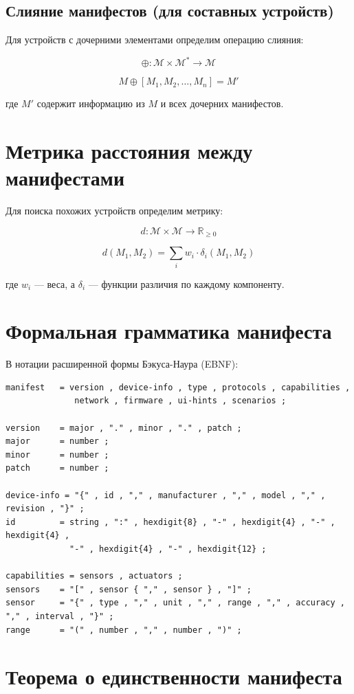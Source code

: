 \documentclass{article}
\begin{document}
\subsection{Слияние манифестов (для составных устройств)}
Для устройств с дочерними элементами определим операцию слияния:

\[
\oplus: \mathcal{M} \times \mathcal{M}^* \to \mathcal{M}
\]

\[
M \oplus [M_1, M_2, \ldots, M_n] = M'
\]

где $M'$ содержит информацию из $M$ и всех дочерних манифестов.

\section{Метрика расстояния между манифестами}

Для поиска похожих устройств определим метрику:

\[
d: \mathcal{M} \times \mathcal{M} \to \mathbb{R}_{\geq 0}
\]

\[
d(M_1, M_2) = \sum_{i} w_i \cdot \delta_i(M_1, M_2)
\]

где $w_i$ — веса, а $\delta_i$ — функции различия по каждому компоненту.

\section{Формальная грамматика манифеста}

В нотации расширенной формы Бэкуса-Наура (EBNF):

\begin{verbatim}
manifest   = version , device-info , type , protocols , capabilities , 
              network , firmware , ui-hints , scenarios ;

version    = major , "." , minor , "." , patch ;
major      = number ;
minor      = number ;
patch      = number ;

device-info = "{" , id , "," , manufacturer , "," , model , "," , revision , "}" ;
id         = string , ":" , hexdigit{8} , "-" , hexdigit{4} , "-" , hexdigit{4} , 
             "-" , hexdigit{4} , "-" , hexdigit{12} ;

capabilities = sensors , actuators ;
sensors    = "[" , sensor { "," , sensor } , "]" ;
sensor     = "{" , type , "," , unit , "," , range , "," , accuracy , "," , interval , "}" ;
range      = "(" , number , "," , number , ")" ;
\end{verbatim}

\section{Теорема о единственности манифеста}
\end{document}
